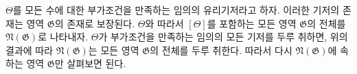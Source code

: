 
$\Theta$를 모든 수에 대한 부가조건을 만족하는 임의의 유리기저라고 하자. 이러한 기저의 존재는 영역 $\mathfrak G$의 존재로 보장된다. $\Theta$와 따라서 $[\Theta]$를 포함하는 모든 영역 $\mathfrak G$의 전체를 $\mathfrak N(\mathfrak G)$로 나타내자. $\Theta$가 부가조건을 만족하는 임의의 모든 기저를 두루 취하면, 위의 결과에 따라 $\mathfrak N(\mathfrak G)$는 모든 영역 $\mathfrak G$의 전체를 두루 취한다. 따라서 다시 $\mathfrak N(\mathfrak G)$에 속하는 영역 $\mathfrak G$만 살펴보면 된다.

